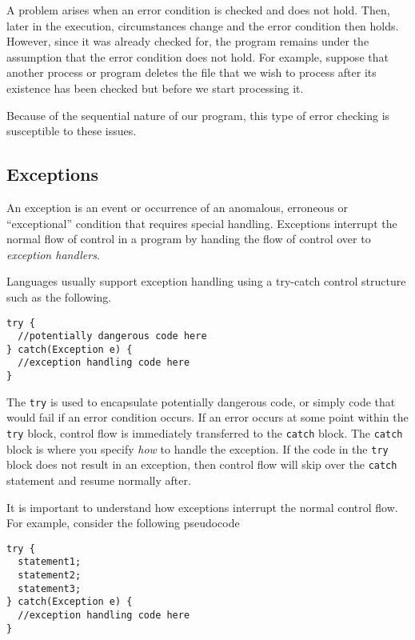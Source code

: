 A problem arises when an error condition is checked and
does not hold.  Then, later in the execution, circumstances change
and the error condition then holds.  However, since it was already
checked for, the program remains under the assumption that the
error condition does not hold.  For example, suppose that another
process or program deletes the file that we wish to process after 
its existence has been checked but before we start processing it.

Because of the sequential nature of our program, this type of 
error checking is susceptible to these issues.

\subsection{Exceptions}

An \gls{exception} is an event or occurrence of an anomalous, 
erroneous or ``exceptional'' condition that requires special 
handling.  Exceptions interrupt the normal flow of control in a
program by handing the flow of control over to \emph{exception
handlers}.

Languages usually support exception handling using a try-catch
control structure such as the following.

\begin{verbatim}
try {
  //potentially dangerous code here  
} catch(Exception e) {
  //exception handling code here
}
\end{verbatim}

The \texttt{try} is used to encapsulate potentially dangerous
code, or simply code that would fail if an error condition occurs.  If an
error occurs at some point within the \texttt{try} block, control
flow is immediately transferred to the \texttt{catch} block.
The \texttt{catch} block is where you specify \emph{how}
to handle the exception.  If the code in the \texttt{try} block 
does not result in an exception, then control flow will skip over the 
\texttt{catch} statement and resume normally after.  

It is important to understand how exceptions interrupt the normal
control flow.  For example, consider the following pseudocode

\begin{verbatim}
try {
  statement1;
  statement2;
  statement3;
} catch(Exception e) {
  //exception handling code here
}
\end{verbatim}

